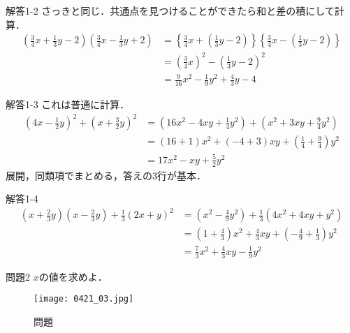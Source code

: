 \documentclass[dvipdfmx]{beamer}
\begin{document}
	\begin{frame}{解答1-2}
		さっきと同じ．共通点を見つけることができたら和と差の積にして計算．
		\begin{align*}
			\left(
				\frac{3}{4}x + \frac{1}{3}y - 2
			\right)
			\left(
				\frac{3}{4}x - \frac{1}{3}y + 2
			\right)
			&= \left\{ \frac{3}{4}x 
				+ \left( \frac{1}{3}y -2\right)
			\right\}
			\left\{ \frac{3}{4}x 
				- \left( \frac{1}{3}y -2\right)
			\right\}\\
			&=\left( \frac{3}{4}x\right)^2 - \left( \frac{1}{3}y -2\right)^2\\
			&= \frac{9}{16}x^2
			- \frac{1}{9}y^2
			+ \frac{4}{3}y-4
		\end{align*}
	\end{frame}

	\begin{frame}{解答1-3}
		これは普通に計算．
		\begin{align*}
			\left(
				4x - \frac{1}{2}y
			\right)^2 + 
			\left(
				x + \frac{3}{2}y
			\right)^2
			&=
			\left(
				16x^2 - 4xy + \frac{1}{4}y^2
			\right) + 
			\left(
				x^2 + 3 xy + \frac{9}{4}y^2
			\right)\\
			&= (16 +1) x^2 + (-4 +3)xy 
			+ \left( \frac{1}{4} + \frac{9}{4}\right)y^2\\
			&= 17x^2 -xy + \frac{5}{2}y^2
		\end{align*}
		展開，同類項でまとめる，答えの3行が基本．
	\end{frame}

	\begin{frame}{解答1-4}
		\begin{align*}
			\left(
				x + \frac{2}{3}y
			\right)
			\left(
				x - \frac{2}{3}y
			\right)
			+ \frac{1}{3}(2x + y)^2
			&=
			\left(
				x^2 - \frac{4}{9}y^2
			\right) + \frac{1}{3} (4x^2 + 4xy + y^2)\\
			&=
			\left(
				1 + \frac{4}{3}
			\right)x^2
			+\frac{4}{3}xy
			+\left(
				-\frac{4}{9} + \frac{1}{3}
			\right)y^2\\
			&=
			\frac{7}{3}x^2 + \frac{4}{3}xy - \frac{1}{9}y^2
		\end{align*}
	\end{frame}


	\begin{frame}{問題2}
		$x$の値を求めよ．
		\begin{figure}[htbp]
			\centering
			\texttt{[image: 0421\_03.jpg]}
			\caption{問題}
			\label{jpg:0421_03}
		\end{figure}
	\end{frame}
\end{document}
